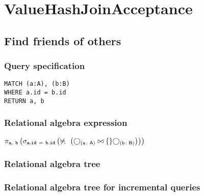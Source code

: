 \section{ValueHashJoinAcceptance}

\subsection{Find friends of others}

\subsubsection*{Query specification}

\begin{lstlisting}
MATCH (a:A), (b:B)
WHERE a.id = b.id
RETURN a, b
\end{lstlisting}

\subsubsection*{Relational algebra expression}

$\projection{\var{a},~\var{b}} \left(\selection{\mathtt{a.id~=~b.id}} \left(\alldifferent{} \left(\getvertices{a}{A} \join \{\} \getvertices{b}{B}\right)\right)\right)$

\subsubsection*{Relational algebra tree}


\subsubsection*{Relational algebra tree for incremental queries}

